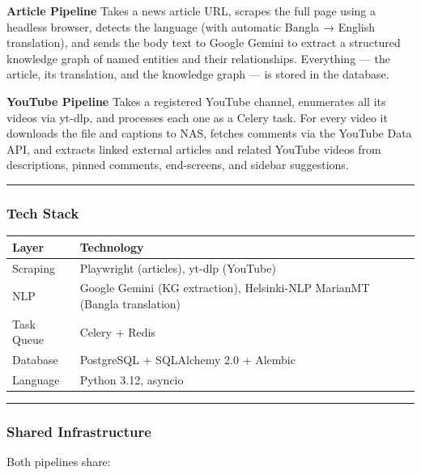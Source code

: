 \documentclass[
]{article}
\newcounter{none} %
\begin{document}
\textbf{Article Pipeline} Takes a news article URL, scrapes the full
page using a headless browser, detects the language (with automatic
Bangla → English translation), and sends the body text to Google Gemini
to extract a structured knowledge graph of named entities and their
relationships. Everything --- the article, its translation, and the
knowledge graph --- is stored in the database.

\textbf{YouTube Pipeline} Takes a registered YouTube channel, enumerates
all its videos via yt-dlp, and processes each one as a Celery task. For
every video it downloads the file and captions to NAS, fetches comments
via the YouTube Data API, and extracts linked external articles and
related YouTube videos from descriptions, pinned comments, end-screens,
and sidebar suggestions.

\begin{center}\rule{0.5\linewidth}{0.5pt}\end{center}

\subsubsection{Tech Stack}\label{tech-stack}

{\def\LTcaptype{none} %
\begin{longtable}[]{@{}ll@{}}
\toprule\noalign{}
Layer & Technology \\
\midrule\noalign{}
\endhead
\bottomrule\noalign{}
\endlastfoot
Scraping & Playwright (articles), yt-dlp (YouTube) \\
NLP & Google Gemini (KG extraction), Helsinki-NLP MarianMT (Bangla
translation) \\
Task Queue & Celery + Redis \\
Database & PostgreSQL + SQLAlchemy 2.0 + Alembic \\
Language & Python 3.12, asyncio \\
\end{longtable}
}

\begin{center}\rule{0.5\linewidth}{0.5pt}\end{center}

\subsubsection{Shared Infrastructure}\label{shared-infrastructure}

Both pipelines share:
\end{document}
